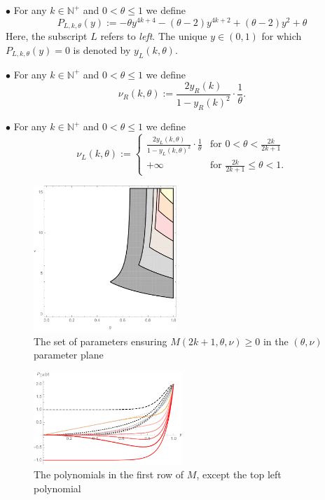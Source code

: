 \documentclass[a4paper]{article}
\newcommand{\te}{\theta}
\newcommand{\nul}{\nu_L(k,\theta)}
\newcommand{\nur}{\nu_R(k,\theta)}
\newcommand{\yl}{y_L(k,\theta)}
\newcommand{\yr}{y_R(k)}
\newcommand{\nplus}{\mathbb{N}^+}
\newcommand{\Pol}{P_{L,k,\te}(y)}
\begin{document}
$\bullet$ For any $k\in\nplus$ and $0<\te\le 1$ we define
\[\Pol:=-\theta  y^{4 k+4}-(\theta -2) y^{4 k+2}+(\theta -2) y^2+\theta \]
Here, the subscript $L$ refers to \textit{left}. The unique $y\in(0,1)$ for which $\Pol=0$ is denoted by $\yl$. 

$\bullet$ For any $k\in\nplus$ and $0<\te\le 1$ we define
\[\nur:=\frac{2\yr}{1-\yr^2}\cdot \frac{1}{\te}.\]

$\bullet$ For any $k\in\nplus$ and $0<\te\le 1$ we define
\[\nul:=\begin{cases}
 \frac{2\yl}{1-\yl^2}\cdot \frac{1}{\te} & \text{for } 0<\te<\frac{2k}{2k+1}\\
 +\infty & \text{for } \frac{2k}{2k+1}\le \te<1.
\end{cases}\]



\begin{figure}
\begin{center}
\includegraphics[width=0.48\textwidth]{fig_variousk.pdf}
\caption{The set of parameters ensuring $M(2k+1,\te,\nu)\ge 0$ in the $(\te,\nu)$ parameter plane}\label{fig_variousk}
\end{center}
\end{figure}

\begin{figure}
\begin{center}
\includegraphics[width=0.5\textwidth]{fig_excepttopleft.pdf}
\caption{The polynomials in the first row of $M$, except the top left polynomial}\label{fig_excepttopleft}
\end{center}
\end{figure}
\end{document}
